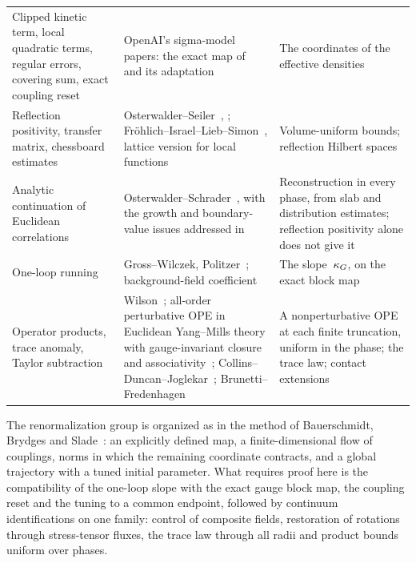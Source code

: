 \begin{longtable}{@{}p{}p{}p{}@{}}
Clipped kinetic term, local quadratic terms, regular errors, covering sum, exact coupling reset & OpenAI's sigma-model papers: the exact map of~\cite[\S5, pp.~38--55]{OpenAI2026O4} and its adaptation~\cite[\S3.3, pp.~23--28]{OpenAI2026O3} & The coordinates of the effective densities\\[2pt]
Reflection positivity, transfer matrix, chessboard estimates & Osterwalder--Seiler~\cite{OsterwalderSeiler1978}, \cite[\S2a, Theorem~2.1]{Seiler1982}; Fr\"ohlich--Israel--Lieb--Simon~\cite[\S4, Theorems~4.1--4.2]{FrohlichIsraelLiebSimon1978}, lattice version for local functions~\cite[Theorem~2.2]{Seiler1982} & Volume-uniform bounds; reflection Hilbert spaces\\[2pt]
Analytic continuation of Euclidean correlations & Osterwalder--Schrader~\cite{OsterwalderSchrader1973}, with the growth and boundary-value issues addressed in~\cite{OsterwalderSchrader1975} & Reconstruction in every phase, from slab and distribution estimates; reflection positivity alone does not give it\\[2pt]
One-loop running & Gross--Wilczek, Politzer~\cite{GrossWilczek1973,Politzer1973}; background-field coefficient~\cite[\S3.3]{Abbott1982} & The slope~$\kappa_G$, on the exact block map\\[2pt]
Operator products, trace anomaly, Taylor subtraction & Wilson~\cite[\S II]{Wilson1969}; all-order perturbative OPE in Euclidean Yang--Mills theory with gauge-invariant closure and associativity~\cite{FrobHolland2016}; Collins--Duncan--Joglekar~\cite[(3.19)--(3.21)]{CollinsDuncanJoglekar1977}; Brunetti--Fredenhagen~\cite[\S5.2]{BrunettiFredenhagen2000} & A nonperturbative OPE at each finite truncation, uniform in the phase; the trace law; contact extensions\\
\end{longtable}
\endgroup

The renormalization group is organized as in the method of Bauerschmidt, Brydges and Slade~\cite{BauerschmidtBrydgesSlade2019}: an explicitly defined map, a finite-dimensional flow of couplings, norms in which the remaining coordinate contracts, and a global trajectory with a tuned initial parameter. What requires proof here is the compatibility of the one-loop slope with the exact gauge block map, the coupling reset and the tuning to a common endpoint, followed by continuum identifications on one family: control of composite fields, restoration of rotations through stress-tensor fluxes, the trace law through all radii and product bounds uniform over phases.

